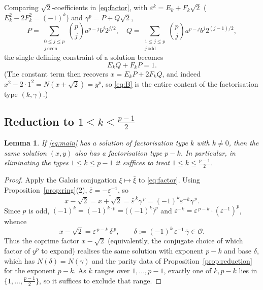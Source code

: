 \documentclass{amsart}
\newtheorem{lemma}{Lemma}
\theoremstyle{definition}
\begin{document}
Comparing $\sqrt2$-coefficients in \eqref{eq:factor}, with
$\varepsilon^k=E_k+F_k\sqrt2$ ($E_k^2-2F_k^2=(-1)^k$) and
$\gamma^p=P+Q\sqrt2$,
\begin{equation}\label{eq:PQ}
P=\!\!\sum_{\substack{0\le j\le p\\ j\ \mathrm{even}}}\!\!\binom pj a^{p-j}b^{j}2^{j/2},
\quad
Q=\!\!\sum_{\substack{1\le j\le p\\ j\ \mathrm{odd}}}\!\!\binom pj a^{p-j}b^{j}2^{(j-1)/2},
\end{equation}
the single defining constraint of a solution becomes
\begin{equation}\label{eq:B}
E_kQ+F_kP=1 .
\end{equation}
(The constant term then recovers $x=E_kP+2F_kQ$, and indeed
$x^2-2\cdot1^2=N(x+\sqrt2)=y^p$, so \eqref{eq:B} is the entire content of the
factorisation type $(k,\gamma)$.)

\subsection*{Reduction to $1\le k\le\frac{p-1}{2}$}

\begin{lemma}\label{lem:half}
If \eqref{eq:main} has a solution of factorisation type $k$ with $k\ne0$, then
the \emph{same} solution $(x,y)$ also has a factorisation type $p-k$. In
particular, in eliminating the types $1\le k\le p-1$ it suffices to treat
$1\le k\le\frac{p-1}{2}$.
\end{lemma}

\begin{proof}
Apply the Galois conjugation $\xi\mapsto\bar\xi$ to \eqref{eq:factor}. Using
Proposition~\ref{prop:ring}(2), $\bar\varepsilon=-\varepsilon^{-1}$, so
\[
x-\sqrt2=\overline{x+\sqrt2}=\bar\varepsilon^{\,k}\bar\gamma^{\,p}
=(-1)^k\varepsilon^{-k}\bar\gamma^{\,p}.
\]
Since $p$ is odd, $(-1)^k=(-1)^{k\cdot p}=\big((-1)^k\big)^p$ and
$\varepsilon^{-k}=\varepsilon^{\,p-k}\cdot(\varepsilon^{-1})^{p}$, whence
\[
x-\sqrt2=\varepsilon^{\,p-k}\,\delta^{\,p},
\qquad \delta:=(-1)^k\,\varepsilon^{-1}\,\bar\gamma\in\mathcal O .
\]
Thus the coprime factor $x-\sqrt2$ (equivalently, the conjugate choice of
which factor of $y^p$ to expand) realises the same solution with exponent
$p-k$ and base $\delta$, which has $N(\delta)=N(\gamma)$ and the parity data of
Proposition~\ref{prop:reduction} for the exponent $p-k$. As $k$ ranges over
$1,\dots,p-1$, exactly one of $k,p-k$ lies in $\{1,\dots,\frac{p-1}{2}\}$, so
it suffices to exclude that range.
\end{proof}
\end{document}
